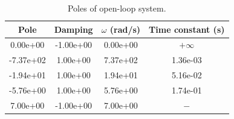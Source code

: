 \documentclass[letterpaper, 10 pt, conference]{ieeeconf}
\begin{document}
\begin{table}[h]
    \centering
    \caption{Poles of open-loop system.}
    \begin{tabular}{cccc}
         \hline
         Pole & Damping & $\omega$ (rad/s) & Time constant (s) \\\hline
   0.00e+00 &   -1.00e+00 &      0.00e+00    &           $+\infty$  \\
 -7.37e+02   &  1.00e+00  &     7.37e+02      &    1.36e-03    \\
 -1.94e+01  &   1.00e+00   &    1.94e+01  &        5.16e-02    \\
 -5.76e+00  &   1.00e+00   &    5.76e+00      &    1.74e-01   \\ 
  7.00e+00   & -1.00e+00  &     7.00e+00      &   $-$ \\
        \hline
    \end{tabular}
    \label{tb:ol_poles}
\end{table}

\end{document}
